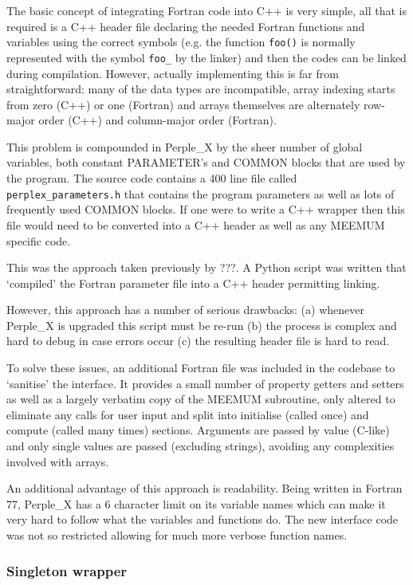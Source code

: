 The basic concept of integrating Fortran code into C++ is very simple, all that is required is a C++ header file declaring the needed Fortran functions and variables using the correct symbols (e.g. the function \texttt{foo()} is normally represented with the symbol \texttt{foo\_} by the linker) and then the codes can be linked during compilation.
However, actually implementing this is far from straightforward: many of the data types are incompatible, array indexing starts from zero (C++) or one (Fortran) and arrays themselves are alternately row-major order (C++) and column-major order (Fortran).

This problem is compounded in Perple\_X by the sheer number of global variables, both constant PARAMETER's and COMMON blocks that are used by the program.
The source code contains a 400 line file called \texttt{perplex\_parameters.h} that contains the program parameters as well as lots of frequently used COMMON blocks.
If one were to write a C++ wrapper then this file would need to be converted into a C++ header as well as any MEEMUM specific code.

This was the approach taken previously by ???. A Python script was written that `compiled' the Fortran parameter file into a C++ header permitting linking.

However, this approach has a number of serious drawbacks: (a) whenever Perple\_X is upgraded this script must be re-run (b) the process is complex and hard to debug in case errors occur (c) the resulting header file is hard to read.

To solve these issues, an additional Fortran file was included in the codebase to `sanitise' the interface.
It provides a small number of property getters and setters as well as a largely verbatim copy of the MEEMUM subroutine, only altered to eliminate any calls for user input and split into initialise (called once) and compute (called many times) sections.
Arguments are passed by value (C-like) and only single values are passed (excluding strings), avoiding any complexities involved with arrays.

An additional advantage of this approach is readability.
Being written in Fortran 77, Perple\_X has a 6 character limit on its variable names which can make it very hard to follow what the variables and functions do.
The new interface code was not so restricted allowing for much more verbose function names.

\subsubsection{Singleton wrapper}

